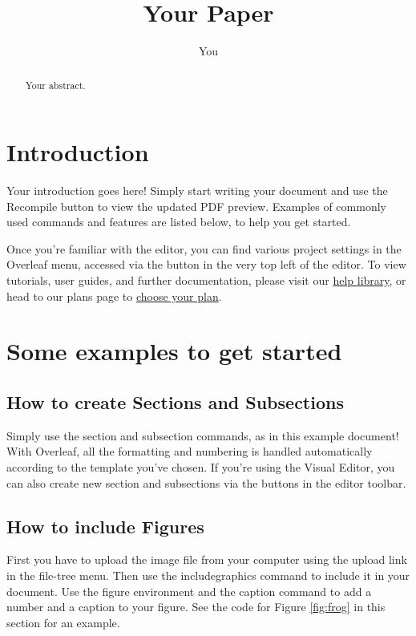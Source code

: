 \documentclass{article}
\title{Your Paper}
\author{You}
\begin{document}
	\maketitle

	\begin{abstract}
		Your abstract.
	\end{abstract}

	\section{Introduction}

	Your introduction goes here! Simply start writing your document and use the Recompile
	button to view the updated PDF preview. Examples of commonly used commands
	and features are listed below, to help you get started.

	Once you're familiar with the editor, you can find various project settings
	in the Overleaf menu, accessed via the button in the very top left of the editor.
	To view tutorials, user guides, and further documentation, please visit our \href{https://www.overleaf.com/learn}{help
	library}, or head to our plans page to
	\href{https://www.overleaf.com/user/subscription/plans}{choose your plan}.



	\section{Some examples to get started}

	\subsection{How to create Sections and Subsections}

	Simply use the section and subsection commands, as in this example document!
	With Overleaf, all the formatting and numbering is handled automatically
	according to the template you've chosen. If you're using the Visual Editor,
	you can also create new section and subsections via the buttons in the
	editor toolbar.

	\subsection{How to include Figures}

	First you have to upload the image file from your computer using the upload link
	in the file-tree menu. Then use the includegraphics command to include it in
	your document. Use the figure environment and the caption command to add a number
	and a caption to your figure. See the code for Figure \ref{fig:frog} in this
	section for an example.
\end{document}
